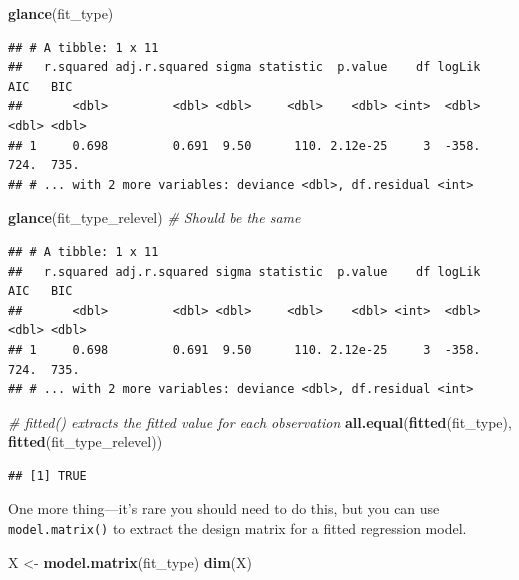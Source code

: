 \documentclass[12pt,oneside,openany]{book}
\newenvironment{Shaded}{\begin{snugshade}}{\end{snugshade}}
\newcommand{\KeywordTok}[1]{\textcolor[rgb]{0.13,0.29,0.53}{\textbf{#1}}}
\newcommand{\StringTok}[1]{\textcolor[rgb]{0.31,0.60,0.02}{#1}}
\newcommand{\CommentTok}[1]{\textcolor[rgb]{0.56,0.35,0.01}{\textit{#1}}}
\newcommand{\NormalTok}[1]{#1}
\begin{document}
\begin{Shaded}
\begin{Highlighting}[]
\KeywordTok{glance}\NormalTok{(fit_type)}
\end{Highlighting}
\end{Shaded}

\begin{verbatim}
## # A tibble: 1 x 11
##   r.squared adj.r.squared sigma statistic  p.value    df logLik   AIC   BIC
##       <dbl>         <dbl> <dbl>     <dbl>    <dbl> <int>  <dbl> <dbl> <dbl>
## 1     0.698         0.691  9.50      110. 2.12e-25     3  -358.  724.  735.
## # ... with 2 more variables: deviance <dbl>, df.residual <int>
\end{verbatim}

\begin{Shaded}
\begin{Highlighting}[]
\KeywordTok{glance}\NormalTok{(fit_type_relevel)  }\CommentTok{# Should be the same}
\end{Highlighting}
\end{Shaded}

\begin{verbatim}
## # A tibble: 1 x 11
##   r.squared adj.r.squared sigma statistic  p.value    df logLik   AIC   BIC
##       <dbl>         <dbl> <dbl>     <dbl>    <dbl> <int>  <dbl> <dbl> <dbl>
## 1     0.698         0.691  9.50      110. 2.12e-25     3  -358.  724.  735.
## # ... with 2 more variables: deviance <dbl>, df.residual <int>
\end{verbatim}

\begin{Shaded}
\begin{Highlighting}[]
\CommentTok{# fitted() extracts the fitted value for each observation}
\KeywordTok{all.equal}\NormalTok{(}\KeywordTok{fitted}\NormalTok{(fit_type), }\KeywordTok{fitted}\NormalTok{(fit_type_relevel))}
\end{Highlighting}
\end{Shaded}

\begin{verbatim}
## [1] TRUE
\end{verbatim}

One more thing---it's rare you should need to do this, but you can use
\texttt{model.matrix()} to extract the design matrix for a fitted
regression model.

\begin{Shaded}
\begin{Highlighting}[]
\NormalTok{X <-}\StringTok{ }\KeywordTok{model.matrix}\NormalTok{(fit_type)}
\KeywordTok{dim}\NormalTok{(X)}
\end{Highlighting}
\end{Shaded}
\end{document}
